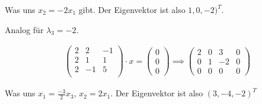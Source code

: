 \documentclass[ngerman,a4paper]{scrartcl}
\begin{document}
Was uns $x_2 = -2x_1$ gibt. Der Eigenvektor ist also $1, 0, -2)^T$.

Analog für $\lambda_3 = -2$.

\begin{align*}
    &\begin{pmatrix}
    2 & 2 & -1\\
    2 & 1 & 1\\
    2 & -1 & 5\\
  \end{pmatrix} \cdot x =
  \begin{pmatrix}
    0\\0\\0
  \end{pmatrix} \implies
  \begin{pmatrix}
    2 & 0 & 3 & 0\\
    0 & 1 & -2 & 0\\
    0 & 0 & 0 & 0
  \end{pmatrix}
\end{align*}

Was uns $x_1 = \frac{-3}{2}x_3$, $x_2 = 2x_1$. Der Eigenvektor ist also $(3, -4, -2)^T$
\end{document}
